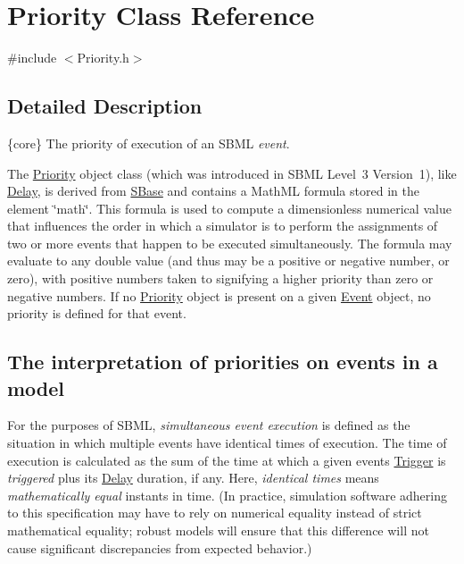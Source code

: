 \hypertarget{class_priority}{}\section{Priority Class Reference}
\label{class_priority}


{\ttfamily \#include $<$Priority.\+h$>$}



\subsection{Detailed Description}
\{core\} The priority of execution of an S\+B\+ML {\itshape event}.

The \hyperlink{class_priority}{Priority} object class (which was introduced in S\+B\+ML Level~3 Version~1), like \hyperlink{class_delay}{Delay}, is derived from \hyperlink{class_s_base}{S\+Base} and contains a Math\+ML formula stored in the element \char`\"{}math\char`\"{}. This formula is used to compute a dimensionless numerical value that influences the order in which a simulator is to perform the assignments of two or more events that happen to be executed simultaneously. The formula may evaluate to any {\ttfamily double} value (and thus may be a positive or negative number, or zero), with positive numbers taken to signifying a higher priority than zero or negative numbers. If no \hyperlink{class_priority}{Priority} object is present on a given \hyperlink{class_event}{Event} object, no priority is defined for that event.\hypertarget{class_priority_priority-interp}{}\subsection{The interpretation of priorities on events in a model}\label{class_priority_priority-interp}
For the purposes of S\+B\+ML, {\itshape simultaneous event execution} is defined as the situation in which multiple events have identical times of execution. The time of execution is calculated as the sum of the time at which a given event\textquotesingle{}s \hyperlink{class_trigger}{Trigger} is {\itshape triggered} plus its \hyperlink{class_delay}{Delay} duration, if any. Here, {\itshape identical times} means {\itshape mathematically equal} instants in time. (In practice, simulation software adhering to this specification may have to rely on numerical equality instead of strict mathematical equality; robust models will ensure that this difference will not cause significant discrepancies from expected behavior.)

